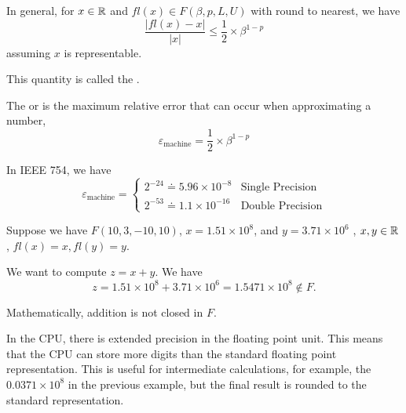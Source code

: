 In general, for \( x \in \mathbb{R} \) and \( fl(x) \in F(\beta, p, L, U) \) with round to nearest, we have \[
    \frac{|fl(x) - x|}{|x|} \leq \frac{1}{2} \times \beta^{1-p}
\] assuming \( x \) is representable.

This quantity is called the .

\begin{definition}
    The  or  is the maximum relative error that can occur when approximating a number, \[
        \varepsilon_{\text{machine}} = \frac{1}{2} \times \beta^{1-p}
    \]
\end{definition}

\begin{remark}
    In IEEE 754, we have \[
        \varepsilon_{\text{machine}} = \begin{cases}
            2^{-24} \doteq 5.96 \times 10^{-8} & \text{Single Precision} \\
            2^{-53} \doteq 1.1 \times 10^{-16} & \text{Double Precision}
        \end{cases}
    \]
\end{remark}

\begin{example}
    Suppose we have \( F(10,3, -10, 10) \), \( x = 1.51 \times 10^8 \), and \( y = 3.71 \times 10^6 \) , \( x, y \in \mathbb{R} \), \( fl(x) = x, fl(y) = y \).

    We want to compute \( z = x + y \). We have \[
        z = 1.51 \times 10^8 + 3.71 \times 10^6 = 1.5471 \times 10^8 \notin F.
    \]
\end{example}

\begin{remark}
    Mathematically, addition is not closed in \( F \).
\end{remark}

\begin{note}
    In the CPU, there is extended precision in the floating point unit. This means that the CPU can store more digits than the standard floating point representation. This is useful for intermediate calculations, for example, the \( 0.0371 \times 10^8 \) in the previous example, but the final result is rounded to the standard representation.
\end{note}

